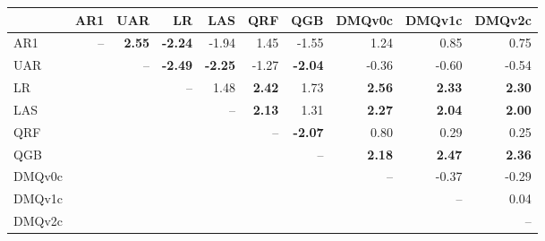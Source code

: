 \begin{tabular}{lrrrrrrrrr}
\toprule
 & AR1 & UAR & LR & LAS & QRF & QGB & DMQv0c & DMQv1c & DMQv2c \\
\midrule
AR1 & -- & \textbf{2.55} & \textbf{-2.24} & -1.94 & 1.45 & -1.55 & 1.24 & 0.85 & 0.75 \\
UAR &  & -- & \textbf{-2.49} & \textbf{-2.25} & -1.27 & \textbf{-2.04} & -0.36 & -0.60 & -0.54 \\
LR &  &  & -- & 1.48 & \textbf{2.42} & 1.73 & \textbf{2.56} & \textbf{2.33} & \textbf{2.30} \\
LAS &  &  &  & -- & \textbf{2.13} & 1.31 & \textbf{2.27} & \textbf{2.04} & \textbf{2.00} \\
QRF &  &  &  &  & -- & \textbf{-2.07} & 0.80 & 0.29 & 0.25 \\
QGB &  &  &  &  &  & -- & \textbf{2.18} & \textbf{2.47} & \textbf{2.36} \\
DMQv0c &  &  &  &  &  &  & -- & -0.37 & -0.29 \\
DMQv1c &  &  &  &  &  &  &  & -- & 0.04 \\
DMQv2c &  &  &  &  &  &  &  &  & -- \\
\bottomrule
\end{tabular}
